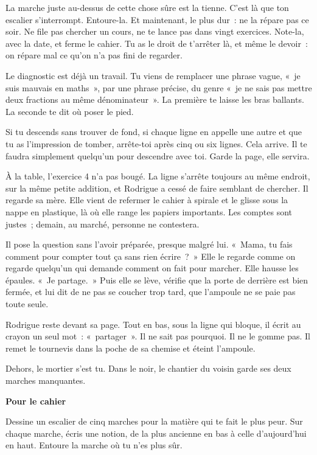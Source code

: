 \documentclass[10.5pt,twoside,openright]{book}
\newenvironment{pourcahier}[1]{\par\vspace{0.9em}\begin{tcolorbox}[colback=black!4,colframe=accent,boxrule=0pt,leftrule=2.2pt,arc=0pt,left=8pt,right=8pt,top=5pt,bottom=5pt]\small\textbf{#1}\par\smallskip}{\end{tcolorbox}\par}
\begin{document}
La marche juste au-dessus de cette chose sûre est la tienne. C’est là que ton escalier s’interrompt. Entoure-la. Et maintenant, le plus dur : ne la répare pas ce soir. Ne file pas chercher un cours, ne te lance pas dans vingt exercices. Note-la, avec la date, et ferme le cahier. Tu as le droit de t’arrêter là, et même le devoir : on répare mal ce qu’on n’a pas fini de regarder.

Le diagnostic est déjà un travail. Tu viens de remplacer une phrase vague, « je suis mauvais en maths », par une phrase précise, du genre « je ne sais pas mettre deux fractions au même dénominateur ». La première te laisse les bras ballants. La seconde te dit où poser le pied.

Si tu descends sans trouver de fond, si chaque ligne en appelle une autre et que tu as l’impression de tomber, arrête-toi après cinq ou six lignes. Cela arrive. Il te faudra simplement quelqu’un pour descendre avec toi. Garde la page, elle servira.

À la table, l’exercice 4 n’a pas bougé. La ligne s’arrête toujours au même endroit, sur la même petite addition, et Rodrigue a cessé de faire semblant de chercher. Il regarde sa mère. Elle vient de refermer le cahier à spirale et le glisse sous la nappe en plastique, là où elle range les papiers importants. Les comptes sont justes ; demain, au marché, personne ne contestera.

Il pose la question sans l’avoir préparée, presque malgré lui. « Mama, tu fais comment pour compter tout ça sans rien écrire ? » Elle le regarde comme on regarde quelqu’un qui demande comment on fait pour marcher. Elle hausse les épaules. « Je partage. » Puis elle se lève, vérifie que la porte de derrière est bien fermée, et lui dit de ne pas se coucher trop tard, que l’ampoule ne se paie pas toute seule.

Rodrigue reste devant sa page. Tout en bas, sous la ligne qui bloque, il écrit au crayon un seul mot : « partager ». Il ne sait pas pourquoi. Il ne le gomme pas. Il remet le tournevis dans la poche de sa chemise et éteint l’ampoule.

Dehors, le mortier s’est tu. Dans le noir, le chantier du voisin garde ses deux marches manquantes.

\begin{pourcahier}{Pour le cahier}
Dessine un escalier de cinq marches pour la matière qui te fait le plus peur. Sur chaque marche, écris une notion, de la plus ancienne en bas à celle d’aujourd’hui en haut. Entoure la marche où tu n’es plus sûr.
\end{pourcahier}
\end{document}
